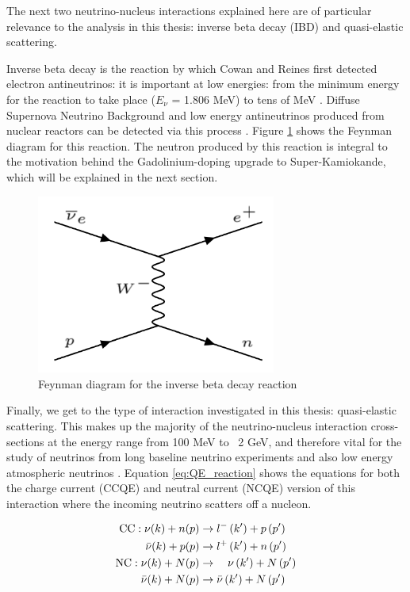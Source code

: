 The next two neutrino-nucleus interactions explained here are of particular relevance to the analysis in this thesis: inverse beta decay (IBD) and quasi-elastic scattering. 

Inverse beta decay is the reaction by which Cowan and Reines first detected electron antineutrinos: it is important at low energies: from the minimum energy for the reaction to take place ($E_{\nu}$ = 1.806 MeV) to tens of MeV \cite{oralbaev2016inverse}. Diffuse Supernova Neutrino Background and low energy antineutrinos produced from nuclear reactors can be detected via this process \cite{li2022prospects}. Figure \ref{fig:IBD_feynman} shows the Feynman diagram for this reaction. The neutron produced by this reaction is integral to the motivation behind the Gadolinium-doping upgrade to Super-Kamiokande, which will be explained in the next section.

\begin{figure}
    \centering
    \includegraphics[width=0.7\textwidth]{Figures/IBD_feynman.png}
    \caption{Feynman diagram for the inverse beta decay reaction}
    \label{fig:IBD_feynman}
\end{figure}

Finally, we get to the type of interaction investigated in this thesis: quasi-elastic scattering. This makes up the majority of the neutrino-nucleus interaction cross-sections at the energy range from 100 MeV to ~2 GeV, and therefore vital for the study of neutrinos from long baseline neutrino experiments and also low energy atmospheric neutrinos \cite{wan2019measurement}. Equation \ref{eq:QE_reaction} shows the equations for both the charge current (CCQE) and neutral current (NCQE) version of this interaction where the incoming neutrino scatters off a nucleon.


\begin{align} 
\mathrm{CC}: \nu(k)+n(p) & \rightarrow l^{-}\left(k^{\prime}\right)+p\left(p^{\prime}\right) \label{eq:QE_reaction}\\
\bar{\nu}(k)+p(p) & \rightarrow l^{+}\left(k^{\prime}\right)+n\left(p^{\prime}\right) \notag\\
\mathrm{NC}: \nu(k)+N(p) & \rightarrow \quad \nu\left(k^{\prime}\right)+N\left(p^{\prime}\right) \notag \\
\bar{\nu}(k)+N(p) & \rightarrow \bar{\nu}\left(k^{\prime}\right)+N\left(p^{\prime}\right) \notag 
\end{align}



